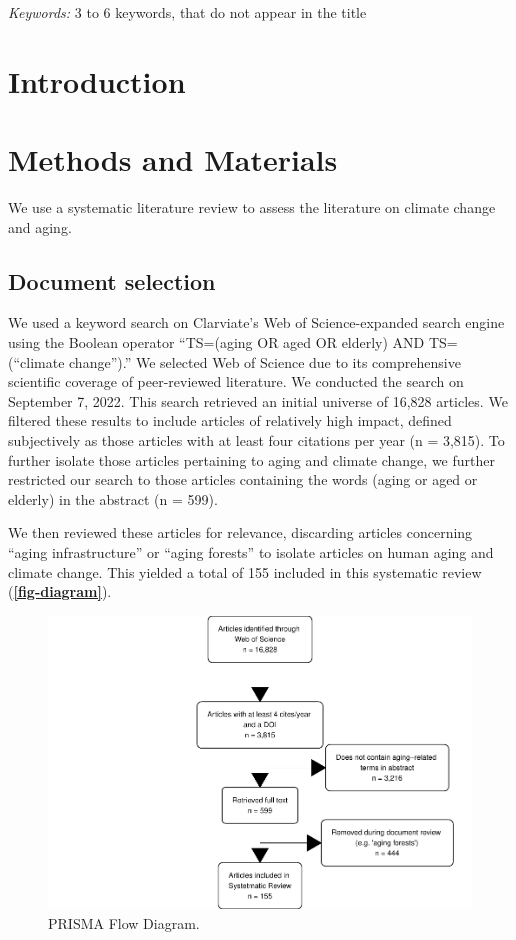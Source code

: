 \documentclass[12pt]{article}
\begin{document}
\noindent%
{\it Keywords:} 3 to 6 keywords, that do not appear in the title
\vfill

\newpage
{} %

\hypertarget{introduction}{%
\section{Introduction}\label{introduction}}

\hypertarget{methods-and-materials}{%
\section{Methods and Materials}\label{methods-and-materials}}

We use a systematic literature review to assess the literature on
climate change and aging.

\hypertarget{document-selection}{%
\subsection{Document selection}\label{document-selection}}

We used a keyword search on Clarviate's Web of Science-expanded search
engine using the Boolean operator ``TS=(aging OR aged OR elderly) AND
TS=(``climate change'').'' We selected Web of Science due to its
comprehensive scientific coverage of peer-reviewed literature. We
conducted the search on September 7, 2022. This search retrieved an
initial universe of 16,828 articles. We filtered these results to
include articles of relatively high impact, defined subjectively as
those articles with at least four citations per year (n = 3,815). To
further isolate those articles pertaining to aging and climate change,
we further restricted our search to those articles containing the words
(aging or aged or elderly) in the abstract (n = 599).

We then reviewed these articles for relevance, discarding articles
concerning ``aging infrastructure'' or ``aging forests'' to isolate
articles on human aging and climate change. This yielded a total of 155
included in this systematic review (\textbf{\autoref{fig-diagram}}).

\begin{figure}
\centering
\includegraphics{MainDocument_files/figure-latex/figureflowdiagram-1.pdf}
\caption{PRISMA Flow Diagram. \label{fig-diagram}}
\end{figure}



\end{document}
